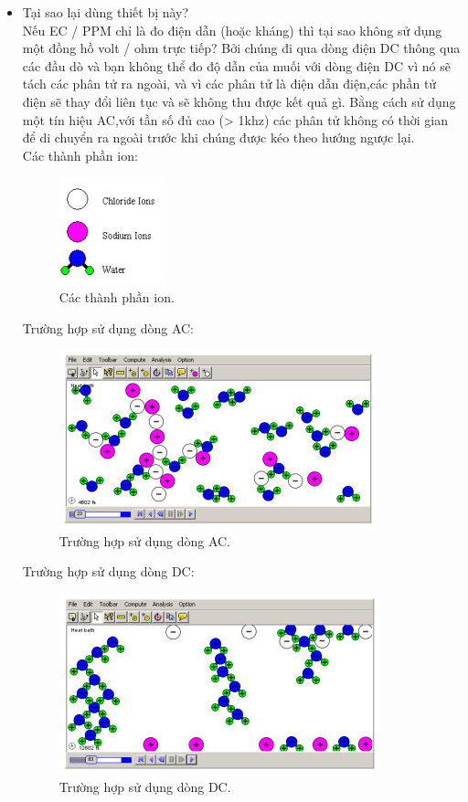 \documentclass[a4paper,12pt,oneside]{article}
\begin{document}
\begin{itemize}
\item Tại sao lại dùng thiết bị này?\\
Nếu EC / PPM chỉ là đo điện dẫn (hoặc kháng) thì tại sao không sử dụng một đồng hồ volt / ohm trực tiếp? Bởi chúng đi qua dòng điện DC thông qua các đầu dò và bạn không thể đo độ dẫn của muối với dòng điện DC vì nó sẽ tách các phân tử ra ngoài, và vì các phân tử là điện dẫn điện,các phần tử điện sẽ thay đổi liên tục và sẽ không thu được kết quả gì. Bằng cách sử dụng một tín hiệu AC,với tần số đủ cao (> 1khz) các phân tử không có thời gian để di chuyển ra ngoài trước khi chúng được kéo theo hướng ngược lại.\\
Các thành phần ion:
\begin{figure}[H]
\centering
\begin{center}
\includegraphics[scale=1]{hinh/PPM/ppm_ion.png}
\end{center}
\caption{Các thành phần ion.}
\end{figure}

Trường hợp sử dụng dòng AC:
\begin{figure}[H]
\centering
\begin{center}
\includegraphics[scale=1]{hinh/PPM/ppm_AC.png}
\end{center}
\caption{Trường hợp sử dụng dòng AC.}
\end{figure}

Trường hợp sử dụng dòng DC:
\begin{figure}[H]
\centering
\begin{center}
\includegraphics[scale=1]{hinh/PPM/ppm_DC.png}
\end{center}
\caption{Trường hợp sử dụng dòng DC.}
\end{figure}


\end{itemize}
\end{document}
